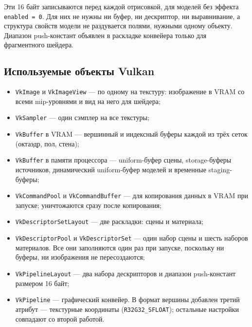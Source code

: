 \documentclass[14pt,a4paper]{extarticle}
\begin{document}
Эти 16 байт записываются перед каждой отрисовкой, для моделей без эффекта
\texttt{enabled = 0}. Для них не нужны ни буфер, ни дескриптор, ни
выравнивание, а структура свойств модели не раздувается полями, нужными
одному объекту. Диапазон push-констант объявлен в раскладке конвейера только
для фрагментного шейдера.

\subsection{Используемые объекты Vulkan}

\begin{itemize}[leftmargin=*]
	\item \texttt{VkImage} и \texttt{VkImageView} — по одному на текстуру:
	изображение в VRAM со всеми mip-уровнями и вид на него для шейдера;

	\item \texttt{VkSampler} — один сэмплер на все текстуры;

	\item \texttt{VkBuffer} в VRAM — вершинный и индексный буферы каждой из
	трёх сеток (октаэдр, пол, стена);

	\item \texttt{VkBuffer} в памяти процессора — uniform-буфер сцены,
	storage-буферы источников, динамический uniform-буфер моделей и временные
	staging-буферы;

	\item \texttt{VkCommandPool} и \texttt{VkCommandBuffer} — для копирования
	данных в VRAM при запуске; уничтожаются сразу после копирования;

	\item \texttt{VkDescriptorSetLayout} — две раскладки: сцены и материала;

	\item \texttt{VkDescriptorPool} и \texttt{VkDescriptorSet} — один набор
	сцены и шесть наборов материалов. Все они заполняются один раз при
	запуске, поскольку ни буферы, ни изображения не пересоздаются;

	\item \texttt{VkPipelineLayout} — два набора дескрипторов и диапазон
	push-констант размером 16 байт;

	\item \texttt{VkPipeline} — графический конвейер. В формат вершины
	добавлен третий атрибут — текстурные координаты
	(\texttt{R32G32\_SFLOAT}); остальные настройки совпадают со второй
	работой.
\end{itemize}
\end{document}
